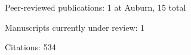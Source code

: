\begin{tightItemize}
    \item Peer-reviewed publications: 1 at Auburn, 15 total
    \item Manuscripts currently under review: 1
    \item Citations: 534
\end{tightItemize}
